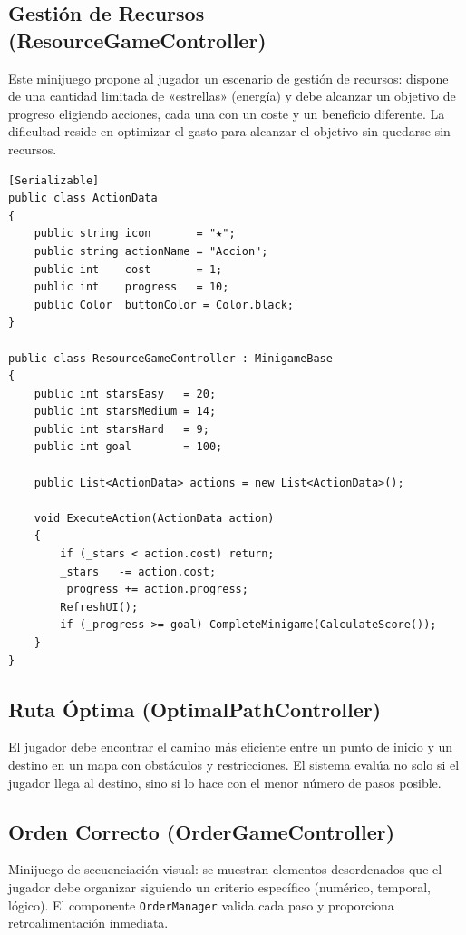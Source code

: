\documentclass[12pt, a4paper]{report}
\begin{document}
\subsection{Gestión de Recursos (ResourceGameController)}

Este minijuego propone al jugador un escenario de gestión de recursos: dispone
de una cantidad limitada de «estrellas» (energía) y debe alcanzar un objetivo
de progreso eligiendo acciones, cada una con un coste y un beneficio diferente.
La dificultad reside en optimizar el gasto para alcanzar el objetivo sin
quedarse sin recursos.

\begin{lstlisting}[caption={ResourceGameController.cs — Gestión de acciones con coste y progreso},
                   label={lst:resource}]
[Serializable]
public class ActionData
{
    public string icon       = "★";
    public string actionName = "Accion";
    public int    cost       = 1;
    public int    progress   = 10;
    public Color  buttonColor = Color.black;
}

public class ResourceGameController : MinigameBase
{
    public int starsEasy   = 20;
    public int starsMedium = 14;
    public int starsHard   = 9;
    public int goal        = 100;

    public List<ActionData> actions = new List<ActionData>();

    void ExecuteAction(ActionData action)
    {
        if (_stars < action.cost) return;
        _stars   -= action.cost;
        _progress += action.progress;
        RefreshUI();
        if (_progress >= goal) CompleteMinigame(CalculateScore());
    }
}
\end{lstlisting}

\subsection{Ruta Óptima (OptimalPathController)}

El jugador debe encontrar el camino más eficiente entre un punto de inicio y
un destino en un mapa con obstáculos y restricciones. El sistema evalúa no
solo si el jugador llega al destino, sino si lo hace con el menor número de
pasos posible.

\subsection{Orden Correcto (OrderGameController)}

Minijuego de secuenciación visual: se muestran elementos desordenados que el
jugador debe organizar siguiendo un criterio específico (numérico, temporal,
lógico). El componente \texttt{OrderManager} valida cada paso y proporciona
retroalimentación inmediata.
\end{document}
